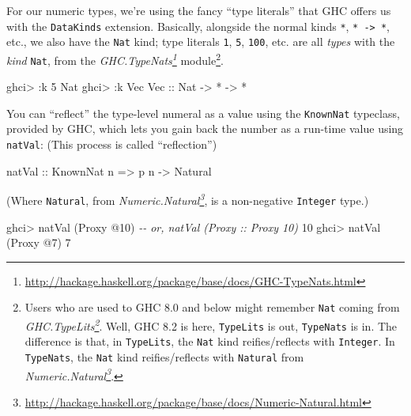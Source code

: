 \documentclass[]{article}
\newenvironment{Shaded}{}{}
\newcommand{\CommentTok}[1]{\textcolor[rgb]{0.38,0.63,0.69}{\textit{#1}}}
\newcommand{\DataTypeTok}[1]{\textcolor[rgb]{0.56,0.13,0.00}{#1}}
\newcommand{\DecValTok}[1]{\textcolor[rgb]{0.25,0.63,0.44}{#1}}
\newcommand{\NormalTok}[1]{#1}
\newcommand{\OperatorTok}[1]{\textcolor[rgb]{0.40,0.40,0.40}{#1}}
\newcommand{\OtherTok}[1]{\textcolor[rgb]{0.00,0.44,0.13}{#1}}
\renewcommand{\href}[2]{#2\footnote{\url{#1}}}
\begin{document}
For our numeric types, we're using the fancy ``type literals'' that GHC offers
us with the \texttt{DataKinds} extension. Basically, alongside the normal kinds
\texttt{*}, \texttt{*\ -\textgreater{}\ *}, etc., we also have the \texttt{Nat}
kind; type literals \texttt{1}, \texttt{5}, \texttt{100}, etc. are all
\emph{types} with the \emph{kind} \texttt{Nat}, from the
\emph{\href{http://hackage.haskell.org/package/base/docs/GHC-TypeNats.html}{GHC.TypeNats}}
module\footnote{Users who are used to GHC 8.0 and below might remember
  \texttt{Nat} coming from
  \emph{\href{http://hackage.haskell.org/package/base/docs/GHC-TypeLits.html}{GHC.TypeLits}}.
  Well, GHC 8.2 is here, \texttt{TypeLits} is out, \texttt{TypeNats} is in. The
  difference is that, in \texttt{TypeLits}, the \texttt{Nat} kind
  reifies/reflects with \texttt{Integer}. In \texttt{TypeNats}, the \texttt{Nat}
  kind reifies/reflects with \texttt{Natural} from
  \emph{\href{http://hackage.haskell.org/package/base/docs/Numeric-Natural.html}{Numeric.Natural}}.}.

\begin{Shaded}
\begin{Highlighting}[]
\NormalTok{ghci}\OperatorTok{\textgreater{}} \OperatorTok{:}\NormalTok{k }\DecValTok{5}
\DataTypeTok{Nat}
\NormalTok{ghci}\OperatorTok{\textgreater{}} \OperatorTok{:}\NormalTok{k }\DataTypeTok{Vec}
\DataTypeTok{Vec}\OtherTok{ ::} \DataTypeTok{Nat} \OtherTok{{-}\textgreater{}} \OperatorTok{*} \OtherTok{{-}\textgreater{}} \OperatorTok{*}
\end{Highlighting}
\end{Shaded}

You can ``reflect'' the type-level numeral as a value using the
\texttt{KnownNat} typeclass, provided by GHC, which lets you gain back the
number as a run-time value using \texttt{natVal}: (This process is called
``reflection'')

\begin{Shaded}
\begin{Highlighting}[]
\OtherTok{natVal ::} \DataTypeTok{KnownNat}\NormalTok{ n }\OtherTok{=\textgreater{}}\NormalTok{ p n }\OtherTok{{-}\textgreater{}} \DataTypeTok{Natural}
\end{Highlighting}
\end{Shaded}

(Where \texttt{Natural}, from
\emph{\href{http://hackage.haskell.org/package/base/docs/Numeric-Natural.html}{Numeric.Natural}},
is a non-negative \texttt{Integer} type.)

\begin{Shaded}
\begin{Highlighting}[]
\NormalTok{ghci}\OperatorTok{\textgreater{}}\NormalTok{ natVal (}\DataTypeTok{Proxy} \OperatorTok{@}\DecValTok{10}\NormalTok{)   }\CommentTok{{-}{-} or, natVal (Proxy :: Proxy 10)}
\DecValTok{10}
\NormalTok{ghci}\OperatorTok{\textgreater{}}\NormalTok{ natVal (}\DataTypeTok{Proxy} \OperatorTok{@}\DecValTok{7}\NormalTok{)}
\DecValTok{7}
\end{Highlighting}
\end{Shaded}
\end{document}
